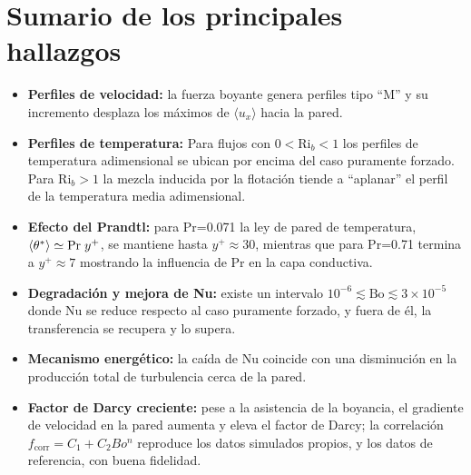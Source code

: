\section{Sumario de los principales hallazgos}

\begin{itemize}

\item \textbf{Perfiles de velocidad:} la fuerza boyante genera perfiles tipo ``M'' y su incremento desplaza los máximos de $\langle u_x\rangle$ hacia la pared.

\item \textbf{Perfiles de temperatura:} Para flujos con $0 < \text{Ri}_b < 1$ los perfiles de temperatura adimensional se ubican por encima del caso puramente forzado. Para $\text{Ri}_b > 1$  la mezcla inducida por la flotación tiende a ``aplanar'' el perfil de la temperatura media adimensional.

\item \textbf{Efecto del Prandtl:} para Pr=0.071 la ley de pared de temperatura, $\langle\theta^*\rangle \simeq \text{Pr} \hspace{1mm} y^+$, se mantiene hasta $y^+ \approx 30$, mientras que para Pr=0.71 termina a $y^+ \approx 7$ mostrando la influencia de Pr en la capa conductiva.

\item \textbf{Degradación y mejora de Nu:} existe un intervalo $10^{-6} \lesssim \text{Bo} \lesssim 3 \times 10^{-5}$ donde Nu se reduce respecto al caso puramente forzado, y fuera de él, la transferencia se recupera y lo supera.

\item \textbf{Mecanismo energético:} la caída de Nu coincide con una disminución en la producción total de turbulencia cerca de la pared.

\item \textbf{Factor de Darcy creciente:} pese a la asistencia de la boyancia, el gradiente de velocidad en la pared aumenta y eleva el factor de Darcy; la correlación $f_{\text{corr}}=C_1+C_2 Bo^n$ reproduce los datos simulados propios, y los datos de referencia, con buena fidelidad.

\end{itemize}

